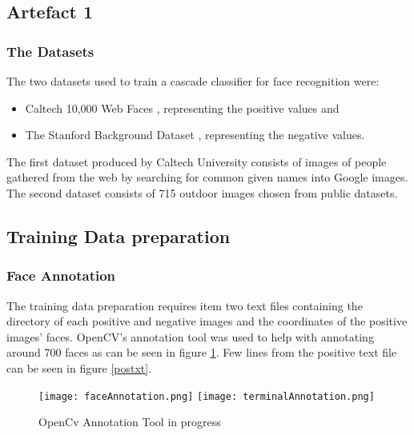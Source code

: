 \subsection{Artefact 1}
    \subsubsection{The Datasets}
    
        The two datasets used to train a cascade classifier for face
        recognition were: 
        \begin{itemize}
            \item Caltech 10,000 Web Faces \cite{fink2007caltech},
                representing the positive values and
            \item The Stanford Background Dataset \cite{hello},
            representing the negative values.
        \end{itemize}
        The first dataset produced by Caltech University
        consists of images of people gathered from the web by
        searching for common given names into  Google images. The
        second dataset consists of 715 outdoor images chosen from
        public datasets.

    \subsection{Training Data preparation}
        \subsubsection{Face Annotation}
            The training data preparation requires item two text files
            containing the directory of each positive and negative
            images and the coordinates of the positive images' faces.
            OpenCV's annotation tool was used to help with annotating
            around 700 faces as can be seen in figure
            \ref{annotationTool}. Few lines from the positive text
            file can be seen in figure \ref{postxt}.

            \begin{figure}[H]
                \centering
                \texttt{[image: faceAnnotation.png]}
                \texttt{[image: terminalAnnotation.png]}
                \caption{OpenCv Annotation Tool in progress}
                \label{annotationTool}
            \end{figure}

